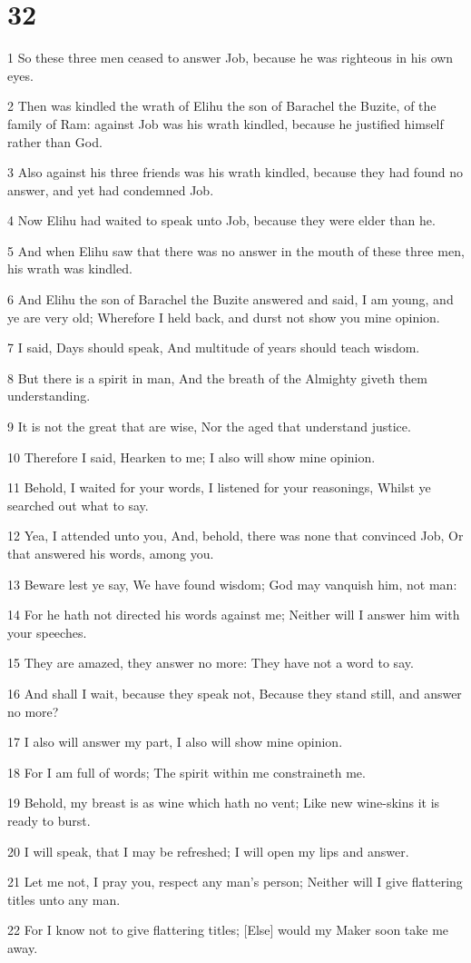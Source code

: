 \chapter{32}

\par 1 So these three men ceased to answer Job, because he was righteous in his own eyes.
\par 2 Then was kindled the wrath of Elihu the son of Barachel the Buzite, of the family of Ram: against Job was his wrath kindled, because he justified himself rather than God.
\par 3 Also against his three friends was his wrath kindled, because they had found no answer, and yet had condemned Job.
\par 4 Now Elihu had waited to speak unto Job, because they were elder than he.
\par 5 And when Elihu saw that there was no answer in the mouth of these three men, his wrath was kindled.
\par 6 And Elihu the son of Barachel the Buzite answered and said, I am young, and ye are very old; Wherefore I held back, and durst not show you mine opinion.
\par 7 I said, Days should speak, And multitude of years should teach wisdom.
\par 8 But there is a spirit in man, And the breath of the Almighty giveth them understanding.
\par 9 It is not the great that are wise, Nor the aged that understand justice.
\par 10 Therefore I said, Hearken to me; I also will show mine opinion.
\par 11 Behold, I waited for your words, I listened for your reasonings, Whilst ye searched out what to say.
\par 12 Yea, I attended unto you, And, behold, there was none that convinced Job, Or that answered his words, among you.
\par 13 Beware lest ye say, We have found wisdom; God may vanquish him, not man:
\par 14 For he hath not directed his words against me; Neither will I answer him with your speeches.
\par 15 They are amazed, they answer no more: They have not a word to say.
\par 16 And shall I wait, because they speak not, Because they stand still, and answer no more?
\par 17 I also will answer my part, I also will show mine opinion.
\par 18 For I am full of words; The spirit within me constraineth me.
\par 19 Behold, my breast is as wine which hath no vent; Like new wine-skins it is ready to burst.
\par 20 I will speak, that I may be refreshed; I will open my lips and answer.
\par 21 Let me not, I pray you, respect any man's person; Neither will I give flattering titles unto any man.
\par 22 For I know not to give flattering titles; [Else] would my Maker soon take me away.

